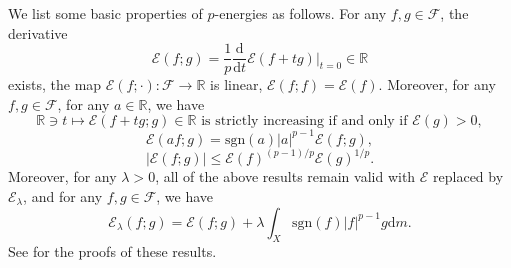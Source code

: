 \documentclass[10pt,a4paper]{amsart}
\numberwithin{equation}{section}
\begin{document}
We list some basic properties of $p$-energies as follows. For any $f,g\in\mathcal{F}$, the derivative
$$\mathcal{E}(f;g)=\frac{1}{p}\frac{\mathrm{d}}{\mathrm{d} t}\mathcal{E}(f+tg)|_{t=0}\in\mathbb{R}$$
exists, the map $\mathcal{E}(f;\cdot):\mathcal{F}\to\mathbb{R}$ is linear, $\mathcal{E}(f;f)=\mathcal{E}(f)$. Moreover, for any $f,g\in\mathcal{F}$, for any $a\in\mathbb{R}$, we have
\begin{equation}\label{eq_quasi_strict}
\mathbb{R}\ni t\mapsto\mathcal{E}(f+tg;g)\in\mathbb{R}\text{ is strictly increasing if and only if }\mathcal{E}(g)>0,
\end{equation}
$$\mathcal{E}(af;g)=\mathrm{sgn}(a)|a|^{p-1}\mathcal{E}(f;g),$$
$$|\mathcal{E}(f;g)|\le\mathcal{E}(f)^{(p-1)/p}\mathcal{E}(g)^{1/p}.$$
Moreover, for any $\lambda>0$, all of the above results remain valid with $\mathcal{E}$ replaced by $\mathcal{E}_\lambda$, and for any $f,g\in\mathcal{F}$, we have
$$\mathcal{E}_\lambda(f;g)=\mathcal{E}(f;g)+\lambda\int_X\mathrm{sgn}(f)|f|^{p-1}g\mathrm{d} m.$$
See \cite[Theorem 3.7, Corollary 3.25]{KS24a} for the proofs of these results.
\end{document}
